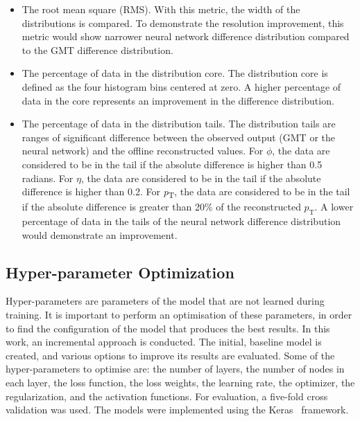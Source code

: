 \documentclass[10pt, paper=a4, UKenglish]{article}
\begin{document}
\begin{itemize}
\item The root mean square (RMS). With this metric, the width of the distributions is compared. To demonstrate the resolution improvement, this metric would show narrower neural network difference distribution compared to the GMT difference distribution.

\item The percentage of data in the distribution core. The distribution core is defined as the four histogram bins centered at zero. A higher percentage of data in the core represents an improvement in the difference distribution.

\item The percentage of data in the distribution tails. The distribution tails are ranges of significant difference between the observed output (GMT or the neural network) and the offline reconstructed values. For $\phi$, the data are considered to be in the tail if the absolute difference is higher than 0.5 radians. For $\eta$, the data are considered to be in the tail if the absolute difference is higher than 0.2. For \textit{p}\textsubscript{T}, the data are considered to be in the tail if the absolute difference is greater than 20\% of the reconstructed $p_\mathrm{T}$. A lower percentage of data in the tails of the neural network difference distribution would demonstrate an improvement.

\end{itemize}

\subsection{Hyper-parameter Optimization}


Hyper-parameters are parameters of the model that are not learned during training. It is important to perform an optimisation of these parameters, in order to find the configuration of the model that produces the best results. In this work, an incremental approach is conducted. The initial, baseline model is created, and various options to improve its results are evaluated. Some of the hyper-parameters to optimise are: the number of layers, the number of nodes in each layer, the loss function, the loss weights, the learning rate, the optimizer, the regularization, and the activation functions. For evaluation, a five-fold cross validation was used. The models were implemented using the Keras~\cite{keras} framework.
\end{document}
